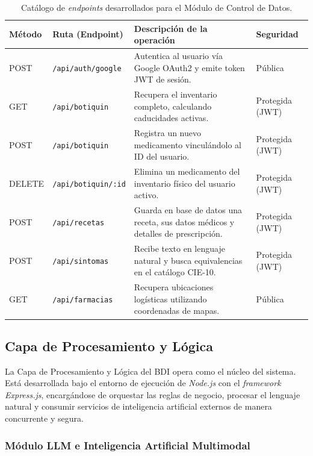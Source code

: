 \begin{table}[H]
\centering
\caption{Catálogo de \emph{endpoints} desarrollados para el Módulo de Control de Datos.}
\label{tab:endpoints_db}
\begin{tabular}{|p{1.5cm}|p{4cm}|p{6cm}|p{2.5cm}|}
\hline
\textbf{Método} & \textbf{Ruta (Endpoint)} & \textbf{Descripción de la operación} & \textbf{Seguridad} \\ \hline
POST & \texttt{/api/auth/google} & Autentica al usuario vía Google OAuth2 y emite token JWT de sesión. & Pública \\ \hline
GET & \texttt{/api/botiquin} & Recupera el inventario completo, calculando caducidades activas. & Protegida (JWT) \\ \hline
POST & \texttt{/api/botiquin} & Registra un nuevo medicamento vinculándolo al ID del usuario. & Protegida (JWT) \\ \hline
DELETE & \texttt{/api/botiquin/:id} & Elimina un medicamento del inventario físico del usuario activo. & Protegida (JWT) \\ \hline
POST & \texttt{/api/recetas} & Guarda en base de datos una receta, sus datos médicos y detalles de prescripción. & Protegida (JWT) \\ \hline
POST & \texttt{/api/sintomas} & Recibe texto en lenguaje natural y busca equivalencias en el catálogo CIE-10. & Protegida (JWT) \\ \hline
GET & \texttt{/api/farmacias} & Recupera ubicaciones logísticas utilizando coordenadas de mapas. & Pública \\ \hline
\end{tabular}
\end{table}

\clearpage

\subsection{Capa de Procesamiento y Lógica}

La Capa de Procesamiento y Lógica del BDI opera como el núcleo del sistema. Está desarrollada bajo el entorno de ejecución de \emph{Node.js} con el \emph{framework Express.js}, encargándose de orquestar las reglas de negocio, procesar el lenguaje natural y consumir servicios de inteligencia artificial externos de manera concurrente y segura.

\subsubsection{Módulo LLM e Inteligencia Artificial Multimodal}

